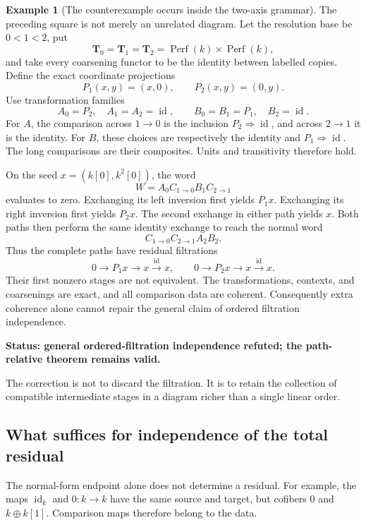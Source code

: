 \documentclass[11pt]{article}
\theoremstyle{definition}
\newtheorem{example}[theorem]{Example}
\theoremstyle{remark}
\newcommand{\Tcat}{\mathbf T}
\newcommand{\id}{\operatorname{id}}
\newcommand{\status}[1]{\textbf{Status: #1.}}
\begin{document}
\begin{example}[The counterexample occurs inside the two-axis grammar]\label{ex:typed-diamond}
The preceding square is not merely an unrelated diagram. Let the resolution base be $0<1<2$, put
\[
\Tcat_0=\Tcat_1=\Tcat_2=\operatorname{Perf}(k)\times\operatorname{Perf}(k),
\]
and take every coarsening functor to be the identity between labelled copies. Define the exact coordinate projections
\[
P_1(x,y)=(x,0),\qquad P_2(x,y)=(0,y).
\]
Use transformation families
\[
A_0=P_2,\quad A_1=A_2=\id,
\qquad
B_0=B_1=P_1,\quad B_2=\id.
\]
For $A$, the comparison across $1\to0$ is the inclusion $P_2\Rightarrow\id$, and across $2\to1$ it is the identity. For $B$, these choices are respectively the identity and $P_1\Rightarrow\id$. The long comparisons are their composites. Units and transitivity therefore hold.

On the seed $x=(k[0],k^2[0])$, the word
\[
W=A_0C_{1\to0}B_1C_{2\to1}
\]
evaluates to zero. Exchanging its left inversion first yields $P_1x$. Exchanging its right inversion first yields $P_2x$. The second exchange in either path yields $x$. Both paths then perform the same identity exchange to reach the normal word
\[
C_{1\to0}C_{2\to1}A_2B_2.
\]
Thus the complete paths have residual filtrations
\[
0\to P_1x\to x\xrightarrow{\id}x,
\qquad
0\to P_2x\to x\xrightarrow{\id}x.
\]
Their first nonzero stages are not equivalent. The transformations, contexts, and coarsenings are exact, and all comparison data are coherent. Consequently extra coherence alone cannot repair the general claim of ordered filtration independence.
\end{example}

\status{general ordered-filtration independence refuted; the path-relative theorem remains valid}

The correction is not to discard the filtration. It is to retain the collection of compatible intermediate stages in a diagram richer than a single linear order.

\subsection{What suffices for independence of the total residual}

The normal-form endpoint alone does not determine a residual. For example, the maps $\id_k$ and $0:k\to k$ have the same source and target, but cofibers $0$ and $k\oplus k[1]$. Comparison maps therefore belong to the data.
\end{document}
